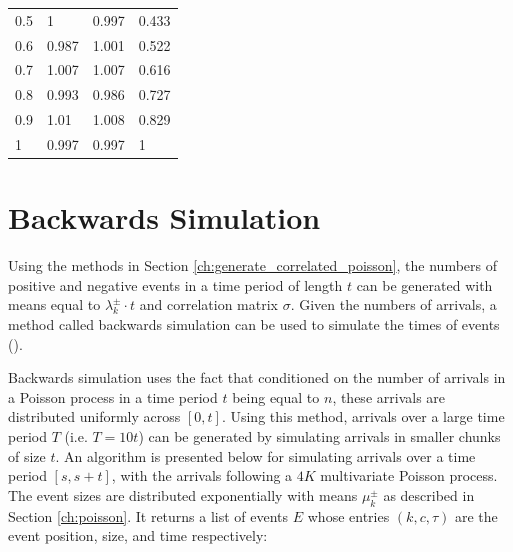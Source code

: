 \begin{table}
\begin{tabular}{l|l|l|l}
0.5                 & 1                               & 0.997                           & 0.433               \\
0.6                 & 0.987                           & 1.001                           & 0.522               \\
0.7                 & 1.007                           & 1.007                           & 0.616               \\
0.8                 & 0.993                           & 0.986                           & 0.727               \\
0.9                 & 1.01                            & 1.008                           & 0.829               \\
1                   & 0.997                           & 0.997                           & 1                  
\end{tabular}
\end{table}

\section{Backwards Simulation} \label{ch:backwards_simulation}

Using the methods in Section \ref{ch:generate_correlated_poisson}, the numbers of positive and negative events in a time period of length $t$ can be generated with means equal to $\lambda^{\pm}_k \cdot t$ and correlation matrix $\sigma$. Given the numbers of arrivals, a method called backwards simulation can be used to simulate the times of events (\cite{A7}). 

Backwards simulation uses the fact that conditioned on the number of arrivals in a Poisson process in a time period $t$ being equal to $n$, these arrivals are distributed uniformly across $[0,t]$. Using this method, arrivals over a large time period $T$ (i.e. $T = 10t$) can be generated by simulating arrivals in smaller chunks of size $t$. An algorithm is presented below for simulating arrivals over a time period $[s,s+t]$, with the arrivals following a $4K$ multivariate Poisson process. The event sizes are distributed exponentially with means $\mu^{\pm}_k$ as described in Section \ref{ch:poisson}. It returns a list of events $E$ whose entries $(k,c,\tau)$ are the event position, size, and time respectively:
\newline

